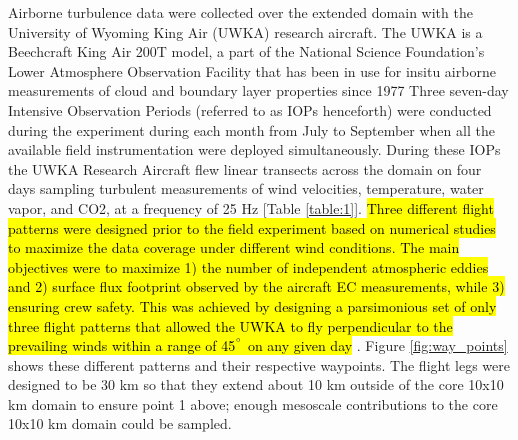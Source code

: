 \documentclass[draft]{agujournal2019}
\begin{document}
Airborne turbulence data were collected over the extended domain with the University of Wyoming King Air (UWKA) research aircraft. The UWKA is a Beechcraft King Air 200T model, a part of the National Science Foundation's Lower Atmosphere Observation Facility that has been in use for insitu airborne measurements of cloud and boundary layer properties since 1977 \cite{rodi2011king, wang_single_2012} Three seven-day Intensive Observation Periods (referred to as IOPs henceforth) were conducted during the experiment during each month from July to September when all the available field instrumentation were deployed simultaneously. During these IOPs the UWKA Research Aircraft flew linear transects across the domain on four days sampling turbulent measurements of wind velocities, temperature, water vapor, and CO2,  at a frequency of 25 Hz [Table \ref{table:1}]. \hl{Three different flight patterns were designed prior to the field experiment based on numerical studies to maximize the data coverage under different wind conditions. The main objectives were to maximize 1) the number of independent atmospheric eddies and 2) surface flux footprint observed by the  aircraft EC measurements, while 3) ensuring crew safety.  This was achieved by designing a  parsimonious set of only three flight patterns that allowed the UWKA to fly perpendicular to the  prevailing winds within a range of 45$^{\degree}$ on any given day} \cite{metzger_novel_2021}. Figure \ref{fig:way_points} shows these different patterns and their respective waypoints. The flight legs were designed to be 30 km so that they extend about 10 km outside of the core 10x10 km domain to ensure point 1 above; enough mesoscale contributions to the core 10x10 km domain could be sampled.
\end{document}

